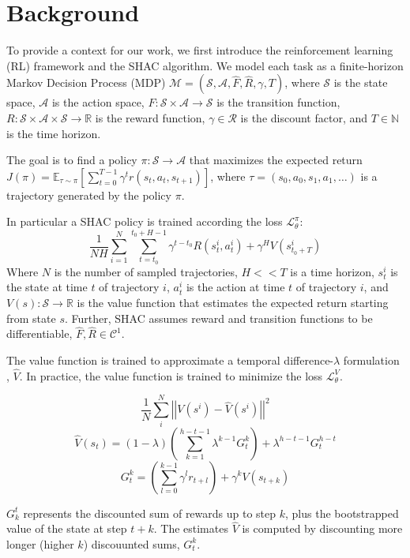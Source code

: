 \section{Background}

To provide a context for our work, we first introduce the reinforcement learning (RL) framework and the SHAC algorithm. We model each task as a finite-horizon Markov Decision Process (MDP) $\mathcal{M} = (\mathcal{S}, \mathcal{A}, \hat{F}, \hat{R}, \gamma, T)$, where $\mathcal{S}$ is the state space, $\mathcal{A}$ is the action space, $F:\mathcal{S}\times\mathcal{A}\rightarrow\mathcal{S}$ is the transition function, $R:\mathcal{S}\times\mathcal{A}\times\mathcal{S}\rightarrow\mathbb{R}$ is the reward function, $\gamma\in\mathcal{R}$ is the discount factor, and $T\in\mathbb{N}$ is the time horizon. 

The goal is to find a policy $\pi:\mathcal{S}\rightarrow\mathcal{A}$ that maximizes the expected return $J(\pi) = \mathbb{E}_{\tau\sim\pi}\left[\sum_{t=0}^{T-1}\gamma^t r(s_t, a_t, s_{t+1})\right]$, where $\tau = (s_0, a_0, s_1, a_1, \ldots)$ is a trajectory generated by the policy $\pi$.

In particular a SHAC policy is trained according the loss $\mathcal{L}_\theta^{\pi}$: 
$$ \frac{1}{NH}\sum_{i=1}^N \sum_{t=t_0}^{t_0+H-1} \gamma^{t-t_0} R(s_t^i, a_t^i) + \gamma^H V(s^i_{t_0+T})$$
Where $N$ is the number of sampled trajectories, $H << T$ is a time horizon, $s_t^i$ is the state at time $t$ of trajectory $i$, $a_t^i$ is the action at time $t$ of trajectory $i$, and $V(s):\mathcal{S}\rightarrow\mathbb{R}$ is the value function that estimates the expected return starting from state $s$. Further, SHAC assumes reward and transition functions to be differentiable, $\hat{F},\hat{R} \in \mathcal{C}^1$.

The value function is trained to approximate a temporal difference-$\lambda$ formulation \cite{Sutton98}, $\hat{V}$. In practice, the value function is trained to minimize the loss $\mathcal{L}_\theta^{V}$.

$$ \frac{1}{N}\sum_i^N\left|\left| V(s^i) - \hat{V}(s^i) \right|\right|^2 $$
$$ \hat{V}(s_t) = (1-\lambda) \left(\sum_{k=1}^{h-t-1}\lambda^{k-1}G_t^k\right) + \lambda^{h-t-1}G_t^{h-t}$$
$$ G_t^k = \left(\sum_{l=0}^{k-1}\gamma^l r_{t+l}\right) + \gamma^k V(s_{t+k})$$

$G^t_k$ represents the discounted sum of rewards up to step $k$, plus the bootstrapped value of the state at step $t+k$. The estimates $\hat{V}$ is computed by discounting more longer (higher $k$) discouunted sums, $G^k_t$.
